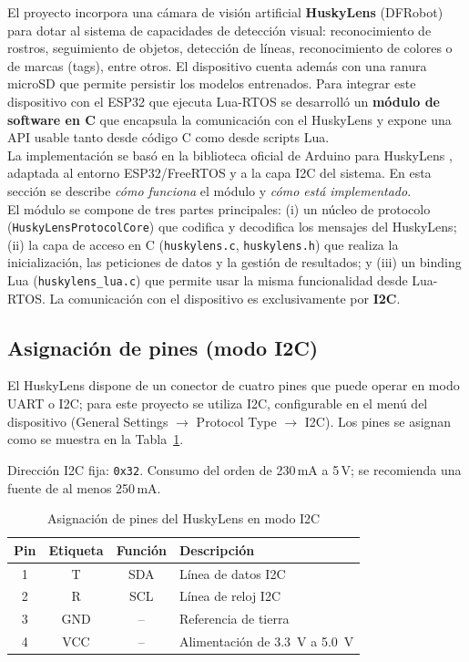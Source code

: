 \documentclass{prgrado}
\begin{document}
El proyecto incorpora una cámara de visión artificial \textbf{HuskyLens} (DFRobot) para dotar al sistema de capacidades de detección visual: reconocimiento de rostros, seguimiento de objetos, detección de líneas, reconocimiento de colores o de marcas (tags), entre otros. El dispositivo cuenta además con una ranura microSD que permite persistir los modelos entrenados. Para integrar este dispositivo con el ESP32 que ejecuta Lua-RTOS se desarrolló un \textbf{módulo de software en C} que encapsula la comunicación con el HuskyLens y expone una API usable tanto desde código C como desde scripts Lua. \\

La implementación se basó en la biblioteca oficial de Arduino para HuskyLens \cite{dfrobot2021huskylens}, adaptada al entorno ESP32/FreeRTOS y a la capa I2C del sistema. En esta sección se describe \emph{cómo funciona} el módulo y \emph{cómo está implementado}. \\

El módulo se compone de tres partes principales: (i) un núcleo de protocolo (\texttt{HuskyLensProtocolCore}) que codifica y decodifica los mensajes del HuskyLens; (ii) la capa de acceso en C (\texttt{huskylens.c}, \texttt{huskylens.h}) que realiza la inicialización, las peticiones de datos y la gestión de resultados; y (iii) un binding Lua (\texttt{huskylens\_lua.c}) que permite usar la misma funcionalidad desde Lua-RTOS. La comunicación con el dispositivo es exclusivamente por \textbf{I2C}.


\subsection{Asignación de pines (modo I2C)}

El HuskyLens dispone de un conector de cuatro pines que puede operar en modo UART o I2C; para este proyecto se utiliza I2C, configurable en el menú del dispositivo (General Settings $\rightarrow$ Protocol Type $\rightarrow$ I2C). Los pines se asignan como se muestra en la Tabla~\ref{tab:huskylens_pines_i2c}. 

Dirección I2C fija: \texttt{0x32}. Consumo del orden de 230\,mA a 5\,V; se recomienda una fuente de al menos 250\,mA.


\begin{table}[htbp]
\centering
\caption{Asignación de pines del HuskyLens en modo I2C}
\label{tab:huskylens_pines_i2c}
\begin{tabular}{|c|c|c|l|}
\hline
\textbf{Pin} & \textbf{Etiqueta} & \textbf{Función} & \textbf{Descripción} \\ \hline
1 & T   & SDA & Línea de datos I2C \\ \hline
2 & R   & SCL & Línea de reloj I2C \\ \hline
3 & GND & --  & Referencia de tierra \\ \hline
4 & VCC & --  & Alimentación de 3.3~V a 5.0~V \\ \hline
\end{tabular}
\end{table}
\end{document}
